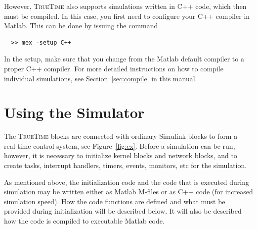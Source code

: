 \documentclass[final,twoside]{rapport}
\begin{document}

However, \textsc{TrueTime} also supports simulations written in C++
code, which then must be compiled. In this case, you first need to
configure your C++ compiler in Matlab. This can be done by issuing
the command

\begin{small}
\begin{verbatim}
  >> mex -setup C++
\end{verbatim}
\end{small}

In the setup, make sure that you change from the Matlab default
compiler to a proper C++ compiler. For more detailed instructions on how to
compile individual simulations, see Section~\ref{sec:compile} in this
manual.

\section{Using the Simulator}

The \textsc{TrueTime} blocks are connected with ordinary Simulink
blocks to form a real-time control system, see Figure~\ref{fig:ex}.
Before a simulation can be run, however, it is necessary to initialize
kernel blocks and network blocks, and to create tasks, interrupt
handlers, timers, events, monitors, etc for the simulation.

As mentioned above, the initialization code and the code that is
executed during simulation may be written either as Matlab M-files or
as C++ code (for increased simulation speed). How the code functions
are defined and what must be provided during initialization will be
described below. It will also be described how the code is compiled to
executable Matlab code.
\end{document}
